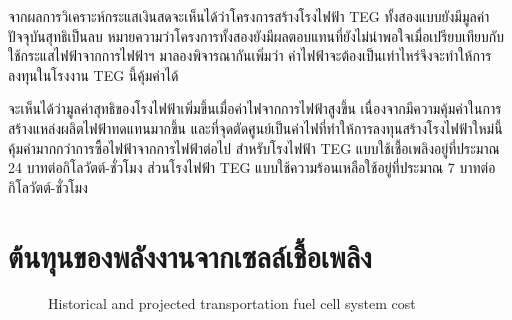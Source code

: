 \documentclass[a4paper,nobib,openany]{tufte-book}
\begin{document}
จากผลการวิเคราะห์กระแสเงินสดจะเห็นได้ว่าโครงการสร้างโรงไฟฟ้า TEG
ทั้งสองแบบยังมีมูลค่าปัจจุบันสุทธิเป็นลบ
หมายความว่าโครงการทั้งสองยังมีผลตอบแทนที่ยังไม่น่าพอใจเมื่อเปรียบเทียบกับใช้กระแสไฟฟ้าจากการไฟฟ้าฯ
มาลองพิจารณากันเพิ่มว่า
ค่าไฟฟ้าจะต้องเป็นเท่าไหร่จึงจะทำให้การลงทุนในโรงงาน TEG นี้คุ้มค่าได้

จะเห็นได้ว่ามูลค่าสุทธิของโรงไฟฟ้าเพิ่มขึ้นเมื่อค่าไฟจากการไฟฟ้าสูงขึ้น
เนื่องจากมีความคุ้มค่าในการสร้างแหล่งผลิตไฟฟ้าทดแทนมากขึ้น
และที่จุดตัดศูนย์เป็นค่าไฟที่ทำให้การลงทุนสร้างโรงไฟฟ้าใหม่นี้คุ้มค่ามากกว่าการซื้อไฟฟ้าจากการไฟฟ้าต่อไป
สำหรับโรงไฟฟ้า TEG แบบใช้เชื้อเพลิงอยู่ที่ประมาณ 24
บาทต่อกิโลวัตต์-ชั่วโมง ส่วนโรงไฟฟ้า TEG
แบบใช้ความร้อนเหลือใช้อยู่ที่ประมาณ 7 บาทต่อกิโลวัตต์-ชั่วโมง

\section{ต้นทุนของพลังงานจากเซลล์เชื้อเพลิง}
\label{sec:orgb97df0a}

\begin{figure}[h]
  \centering
\caption{\label{fig:projected fc cost}Historical and projected transportation fuel cell system cost}
\end{figure}
\end{document}

